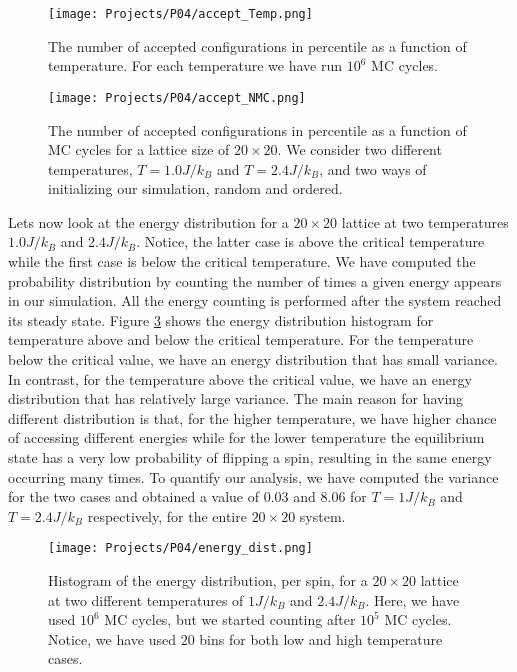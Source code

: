 \documentclass[a4paper]{article}
\begin{document}
\begin{figure}[H]
  \centering
  \texttt{[image: Projects/P04/accept\_Temp.png]}
  \caption{The number of accepted configurations in percentile as a function of temperature. For each temperature we have run $10^6$ MC cycles.}
   \label{accept_Temp}
\end{figure}

\begin{figure}[H]
  \centering
  \texttt{[image: Projects/P04/accept\_NMC.png]}
  \caption{The number of accepted configurations in percentile as a function of MC cycles for a lattice size of $20\times20$. We consider two different temperatures, $T=1.0J/k_B$ and $T=2.4J/k_B$, and two ways of initializing our simulation, random and ordered. }
   \label{accept_NMC}
\end{figure}





Lets now look at the energy distribution for a $20\times20$ lattice at two temperatures $1.0J/k_B$ and $2.4J/k_B$. Notice, the latter case is above the critical temperature while the first case is below the critical temperature. We have computed the probability distribution by counting the number of times a given energy appears in our simulation. All the energy counting is performed after the system reached its steady state. Figure \ref{energy_dist} shows the energy distribution histogram for temperature above and below the critical temperature. For the temperature below the critical value, we have an energy distribution that has small variance. In contrast, for the temperature above the critical value, we have an energy distribution that has relatively large variance. The main reason for having different distribution is that, for the higher temperature, we have higher chance of accessing different energies while for the lower temperature the equilibrium state has a  very low probability of flipping a spin, resulting in the same energy occurring many times. To quantify our analysis, we have computed the variance for the two cases and obtained a value of $0.03$ and $8.06$ for $T=1J/k_B$ and $T=2.4J/k_B$ respectively, for the entire $20 \times 20$ system. 



\begin{figure}[H]
  \centering
  \texttt{[image: Projects/P04/energy\_dist.png]}
  \caption{Histogram of the energy distribution, per spin, for a $20\times20$ lattice at two different temperatures of $1J/k_B$ and $2.4J/k_B$. Here, we have used $10^6$ MC cycles, but we started counting after $10^5$ MC cycles. Notice, we have used $20$ bins for both low and high temperature cases.}
   \label{energy_dist}
\end{figure}
\end{document}
